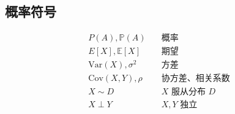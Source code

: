 \documentclass[12pt]{article}
\begin{document}
\subsection{概率符号}
\begin{align*}
P(A), \mathbb{P}(A) &\quad \text{概率} \\
E[X], \mathbb{E}[X] &\quad \text{期望} \\
\text{Var}(X), \sigma^2 &\quad \text{方差} \\
\text{Cov}(X, Y), \rho &\quad \text{协方差、相关系数} \\
X \sim D &\quad \text{$X$ 服从分布 $D$} \\
X \perp Y &\quad \text{$X, Y$ 独立}
\end{align*}
\end{document}
